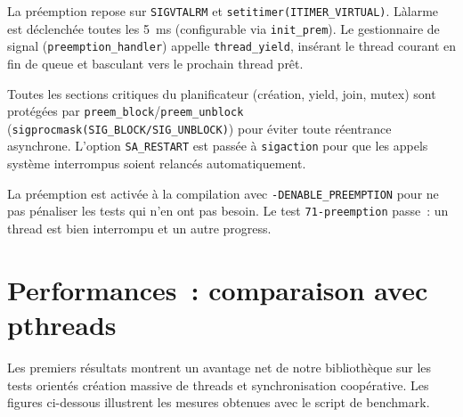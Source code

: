 \documentclass[11pt,a4paper]{article}
\begin{document}
La pr\'eemption repose sur \texttt{SIGVTALRM} et
\texttt{setitimer(ITIMER\_VIRTUAL)}. L\`alarme est d\'eclench\'ee toutes les 5~ms (configurable via \texttt{init\_prem}).
Le gestionnaire de signal (\texttt{preemption\_handler}) appelle
\texttt{thread\_yield}, ins\'erant le thread courant en fin de queue et basculant
vers le prochain thread pr\^et.

Toutes les sections critiques du planificateur (cr\'eation, yield, join, mutex)
sont prot\'eg\'ees par \texttt{preem\_block}/\texttt{preem\_unblock}
(\texttt{sigprocmask(SIG\_BLOCK\-/SIG\_UNBLOCK)}) pour \'eviter toute r\'eentrance
asynchrone. L'option \texttt{SA\_RESTART} est pass\'ee \`a \texttt{sigaction} pour
que les appels syst\`eme interrompus soient relanc\'es automatiquement.

La pr\'eemption est activ\'ee \`a la compilation avec \texttt{-DENABLE\_PREEMPTION}
pour ne pas p\'enaliser les tests qui n'en ont pas besoin. Le test
\texttt{71-preemption} passe~: un thread est bien interrompu et un 
autre progress.

\section{Performances~: comparaison avec pthreads}

Les premiers r\'esultats montrent un avantage net de notre biblioth\`eque sur
les tests orient\'es cr\'eation massive de threads et synchronisation coop\'erative.
Les figures ci-dessous illustrent les mesures obtenues avec le script de benchmark.
\end{document}
